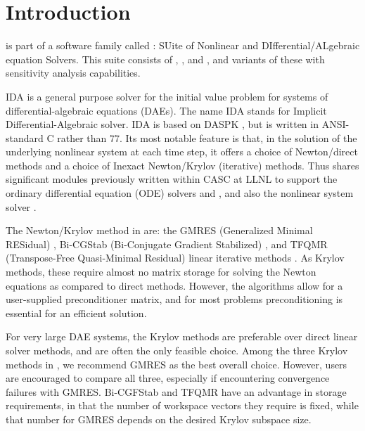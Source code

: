 \chapter{Introduction}\label{s:intro}

{\ida} is part of a software family called {\sundials}: 
SUite of Nonlinear and DIfferential/ALgebraic equation Solvers.  
This suite consists of {\cvode}, {\kinsol}, and {\ida}, and variants of these
with sensitivity analysis capabilities.

IDA is a general purpose solver for the initial value problem for
systems of differential-algebraic equations (DAEs).  The name IDA
stands for Implicit Differential-Algebraic solver.  IDA is based on
DASPK \cite{BHP:94,BHP:98}, but is written in ANSI-standard C
rather than {\F}77.  Its most notable feature is that, in the
solution of the underlying nonlinear system at each time step, it offers
a choice of Newton/direct methods and a choice of Inexact Newton/Krylov
(iterative) methods.  Thus {\ida} shares significant modules previously
written within CASC at LLNL to support the ordinary differential
equation (ODE) solvers {\cvode} \cite{cvode2.4.0_ug,CoHi:96} and {\pvode}
\cite{ByHi:98,ByHi:99}, and also the nonlinear system solver {\kinsol}
\cite{kinsol2.2.0_ug}.

The Newton/Krylov method in {\ida} are:
the GMRES (Generalized Minimal RESidual) \cite{SaSc:86},
Bi-CGStab (Bi-Conjugate Gradient Stabilized) \cite{Van:92}, and
TFQMR (Transpose-Free Quasi-Minimal Residual) linear iterative methods
\cite{Fre:93}.  As Krylov methods, these require almost no matrix storage
for solving the Newton equations as compared to direct methods.
However, the algorithms allow for a user-supplied preconditioner
matrix, and for most problems preconditioning is essential for an
efficient solution.

For very large DAE systems, the Krylov methods are preferable over
direct linear solver methods, and are often the only feasible choice.
Among the three Krylov methods in {\ida}, we recommend GMRES as the
best overall choice.  However, users are encouraged to compare all
three, especially if encountering convergence failures with GMRES.
Bi-CGFStab and TFQMR have an advantage in storage requirements, in
that the number of workspace vectors they require is fixed, while that
number for GMRES depends on the desired Krylov subspace size.

